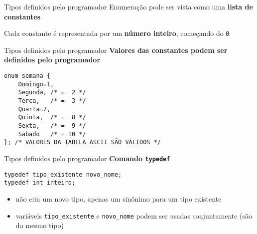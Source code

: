 \documentclass[10pt]{beamer}
\begin{document}
\begin{frame}[fragile]{Tipos definidos pelo programador}
    \huge
    Enumeração pode ser vista como uma \textbf{lista de constantes}
    
    \bigskip
    
    Cada constante é representada por um \textbf{número inteiro}, começando do \texttt{0}
    
\end{frame}

\begin{frame}[fragile]{Tipos definidos pelo programador}
    \huge
    \textbf{Valores das constantes podem ser definidos pelo programador}
    
    \large
    \begin{verbatim}
enum semana {
    Domingo=1,
    Segunda, /* =  2 */
    Terca,   /* =  3 */
    Quarta=7,
    Quinta,  /* =  8 */
    Sexta,   /* =  9 */
    Sabado   /* = 10 */
}; /* VALORES DA TABELA ASCII SÃO VÁLIDOS */
    \end{verbatim}
\end{frame}

\begin{frame}[fragile]{Tipos definidos pelo programador}
    \huge \textbf{Comando \texttt{typedef}}
    
    \bigskip
    
    \Large
    \begin{verbatim}
typedef tipo_existente novo_nome;
typedef int inteiro;
    \end{verbatim}
    
    \large
    \setlength{\leftmargini}{0pt}
    \begin{itemize}
        \item [] não cria um novo tipo, apenas um sinônimo para um tipo existente
        \item [] variáveis \texttt{tipo\_existente} e \texttt{novo\_nome} podem ser usadas conjuntamente (são do mesmo tipo)
    \end{itemize}
\end{frame}
\end{document}
